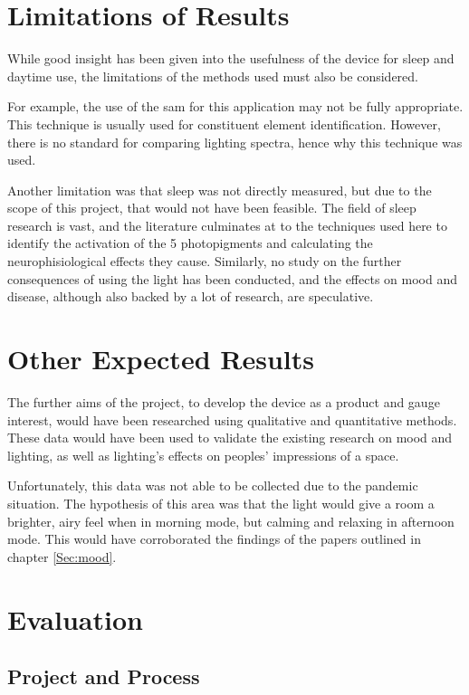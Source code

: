 \section{Limitations of Results}

While good insight has been given into the usefulness of the device for sleep and daytime use, the limitations of the methods used must also be considered.

For example, the use of the \acrshort{sam} for this application may not be fully appropriate. This technique is usually used for constituent element identification. However, there is no standard for comparing lighting spectra, hence why this technique was used.

Another limitation was that sleep was not directly measured, but due to the scope of this project, that would not have been feasible. The field of sleep research is vast, and the literature culminates at to the techniques used here to identify the activation of the 5 photopigments and calculating the neurophisiological effects they cause. Similarly, no study on the further consequences of using the light has been conducted, and the effects on mood and disease, although also backed by a lot of research, are speculative.


\section{Other Expected Results}

The further aims of the project, to develop the device as a product and gauge interest, would have been researched using qualitative and quantitative methods. These data would have been used to validate the existing research on mood and lighting, as well as lighting's effects on peoples' impressions of a space.

Unfortunately, this data was not able to be collected due to the pandemic situation. The hypothesis of this area was that the light would give a room a brighter, airy feel when in \acrshort{morning} mode, but calming and relaxing in \acrshort{afternoon} mode. This would have corroborated the findings of the papers outlined in chapter \ref{Sec:mood}.


\section{Evaluation}

\subsection{Project and Process}

